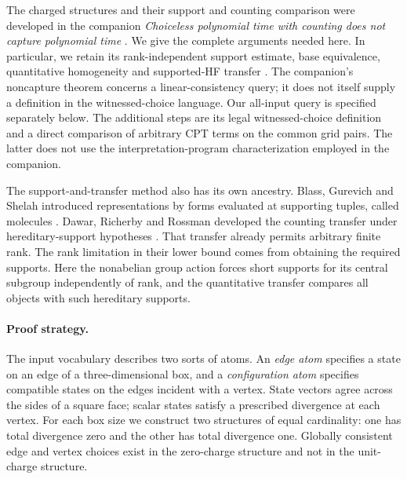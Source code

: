 The charged structures and their support and counting comparison were
developed in the companion \emph{Choiceless polynomial time with counting
does not capture polynomial time}\linebreak
\cite[Sections~2--5]{cptCompanion2026}.
We give the complete arguments needed here. In particular, we retain its
rank-independent support estimate, base equivalence, quantitative
homogeneity and supported-HF transfer
\cite[Propositions~8, 11 and~13, Theorem~14]{cptCompanion2026}.
The companion's noncapture theorem concerns a linear-consistency query;
it does not itself supply a definition in the witnessed-choice language.
Our all-input query is specified separately below. The additional steps
are its legal witnessed-choice definition and a direct comparison of
arbitrary CPT terms on the common grid pairs. The latter does not use
the interpretation-program characterization employed in the companion.

The support-and-transfer method also has its own ancestry. Blass,
Gurevich and Shelah introduced representations by forms evaluated at
supporting tuples, called molecules
\cite[Sections~8--9, published version]{bgs1999}.
Dawar, Richerby and Rossman developed the counting transfer under
hereditary-support hypotheses
\cite[Section~8, Theorem~33, author version]{drr2008}.
That transfer already permits arbitrary finite rank. The rank limitation
in their lower bound comes from obtaining the required supports. Here
the nonabelian group action forces short supports for its central
subgroup independently of rank, and the quantitative transfer compares
all objects with such hereditary supports.

\paragraph{Proof strategy.}
The input vocabulary describes two sorts of atoms. An \emph{edge atom}
specifies a state on an edge of a three-dimensional box, and a
\emph{configuration atom} specifies compatible states on the edges incident
with a vertex. State vectors agree across the sides of a square face;
scalar states satisfy a prescribed divergence at each vertex. For each
box size we construct two structures of equal cardinality: one has total
divergence zero and the other has total divergence one.
Globally consistent edge and vertex choices exist in
the zero-charge structure and not in the unit-charge structure.

